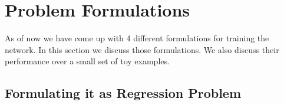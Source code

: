 \section{Problem Formulations}
As of now we have come up with 4 different formulations for training the network. 
In this section we discuss those formulations. 
We also discuss their performance over a small set of toy examples.

\subsection{Formulating it as Regression Problem}